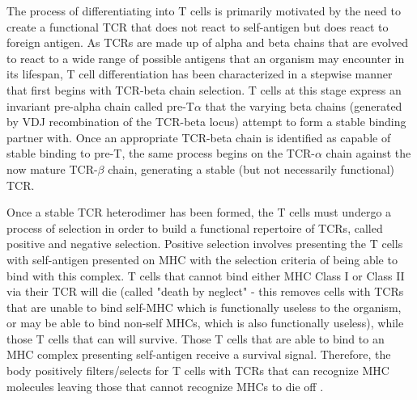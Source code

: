 The process of differentiating into T cells is primarily motivated by the need to create a functional TCR that does not react to self-antigen but does react to foreign antigen. As TCRs are made up of alpha and beta chains that are evolved to react to a wide range of possible antigens that an organism may encounter in its lifespan, T cell differentiation has been characterized in a stepwise manner that first begins with TCR-beta chain selection. T cells at this stage express an invariant pre-alpha chain called pre-T$\alpha$ that the varying beta chains (generated by VDJ recombination of the TCR-beta locus) attempt to form a stable binding partner with. Once an appropriate TCR-beta chain is identified as capable of stable binding to pre-T, the same process begins on the TCR-$\alpha$ chain against the now mature TCR-$\beta$ chain, generating a stable (but not necessarily functional) TCR.

Once a stable TCR heterodimer has been formed, the T cells must undergo a process of selection in order to build a functional repertoire of TCRs, called positive and negative selection. Positive selection involves presenting the T cells with self-antigen presented on MHC with the selection criteria of being able to bind with this complex.  T cells that cannot bind either MHC Class I or Class II via their TCR will die (called "death by neglect" - this removes cells with TCRs that are unable to bind self-MHC which is functionally useless to the organism, or may be able to bind non-self MHCs, which is also functionally useless), while those T cells that can will survive. Those T cells that are able to bind to an MHC complex presenting self-antigen receive a survival signal. Therefore, the body positively filters/selects for T cells with TCRs that can recognize MHC molecules leaving those that cannot recognize MHCs to die off \cite{Palmer2003}.

